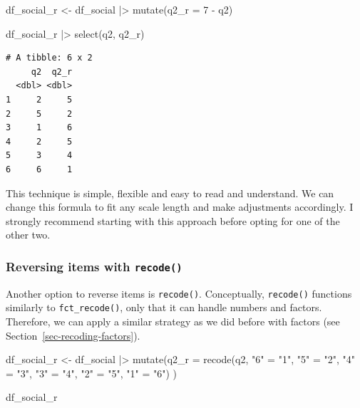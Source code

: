 \documentclass[
  letterpaper,
]{krantz}
\makeatletter
\newenvironment{Shaded}{\begin{snugshade}}{\end{snugshade}}
\newcommand{\AttributeTok}[1]{\textcolor[rgb]{0.40,0.45,0.13}{#1}}
\newcommand{\DecValTok}[1]{\textcolor[rgb]{0.68,0.00,0.00}{#1}}
\newcommand{\FunctionTok}[1]{\textcolor[rgb]{0.28,0.35,0.67}{#1}}
\newcommand{\NormalTok}[1]{\textcolor[rgb]{0.00,0.23,0.31}{#1}}
\newcommand{\OtherTok}[1]{\textcolor[rgb]{0.00,0.23,0.31}{#1}}
\newcommand{\SpecialCharTok}[1]{\textcolor[rgb]{0.37,0.37,0.37}{#1}}
\newcommand{\StringTok}[1]{\textcolor[rgb]{0.13,0.47,0.30}{#1}}
\newenvironment{kframe}{%
\medskip{}
\setlength{\fboxsep}{.8em}
 \def\at@end@of@kframe{}%
 \ifinner\ifhmode%
  \def\at@end@of@kframe{\end{minipage}}%
  \begin{minipage}{\columnwidth}%
 \fi\fi%
 \def\FrameCommand##1{\hskip\@totalleftmargin \hskip-\fboxsep
 \colorbox{shadecolor}{##1}\hskip-\fboxsep
     \hskip-\linewidth \hskip-\@totalleftmargin \hskip\columnwidth}%
 \MakeFramed {\advance\hsize-\width
   \@totalleftmargin\z@ \linewidth\hsize
   \@setminipage}}%
 {\par\unskip\endMakeFramed%
 \at@end@of@kframe}
\renewenvironment{Shaded}{\begin{kframe}}{\end{kframe}}
\makeatother
\begin{document}
\begin{Shaded}
\begin{Highlighting}[]
\NormalTok{df\_social\_r }\OtherTok{\textless{}{-}}
\NormalTok{  df\_social }\SpecialCharTok{|\textgreater{}}
  \FunctionTok{mutate}\NormalTok{(}\AttributeTok{q2\_r =} \DecValTok{7} \SpecialCharTok{{-}}\NormalTok{ q2)}

\NormalTok{df\_social\_r }\SpecialCharTok{|\textgreater{}}
  \FunctionTok{select}\NormalTok{(q2, q2\_r)}
\end{Highlighting}
\end{Shaded}

\begin{verbatim}
# A tibble: 6 x 2
     q2  q2_r
  <dbl> <dbl>
1     2     5
2     5     2
3     1     6
4     2     5
5     3     4
6     6     1
\end{verbatim}

This technique is simple, flexible and easy to read and understand. We
can change this formula to fit any scale length and make adjustments
accordingly. I strongly recommend starting with this approach before
opting for one of the other two.

\subsubsection{\texorpdfstring{Reversing items with
\texttt{recode()}}{Reversing items with recode()}}\label{sec-reversing-items-recode}

Another option to reverse items is \texttt{recode()}. Conceptually,
\texttt{recode()} functions similarly to \texttt{fct\_recode()}, only
that it can handle numbers and factors. Therefore, we can apply a
similar strategy as we did before with factors (see
Section~\ref{sec-recoding-factors}).

\begin{Shaded}
\begin{Highlighting}[]
\NormalTok{df\_social\_r }\OtherTok{\textless{}{-}}
\NormalTok{  df\_social }\SpecialCharTok{|\textgreater{}}
  \FunctionTok{mutate}\NormalTok{(}\AttributeTok{q2\_r =} \FunctionTok{recode}\NormalTok{(q2,}
                       \StringTok{"6"} \OtherTok{=} \StringTok{"1"}\NormalTok{,}
                       \StringTok{"5"} \OtherTok{=} \StringTok{"2"}\NormalTok{,}
                       \StringTok{"4"} \OtherTok{=} \StringTok{"3"}\NormalTok{,}
                       \StringTok{"3"} \OtherTok{=} \StringTok{"4"}\NormalTok{,}
                       \StringTok{"2"} \OtherTok{=} \StringTok{"5"}\NormalTok{,}
                       \StringTok{"1"} \OtherTok{=} \StringTok{"6"}\NormalTok{)}
\NormalTok{         )}

\NormalTok{df\_social\_r}
\end{Highlighting}
\end{Shaded}
\end{document}
